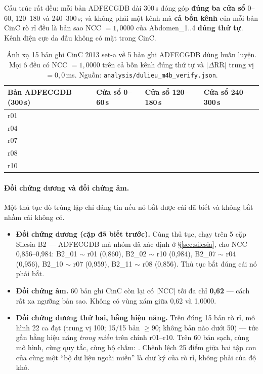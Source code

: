 Cấu trúc rất đều: mỗi bản ADFECGDB dài 300\,s đóng góp \textbf{đúng ba cửa sổ} 0--60, 120--180 và
240--300\,s; và không phải một kênh mà \textbf{cả bốn kênh} của mỗi bản CinC rò rỉ đều là bản sao
NCC $= 1{,}0000$ của Abdomen\_1..4 \textbf{đúng thứ tự}. Kênh điện cực da đầu không có mặt trong CinC.

\begin{table}[H]\centering\small
\caption{Ánh xạ 15 bản ghi CinC 2013 set-a về 5 bản ghi ADFECGDB dùng huấn luyện. Mọi ô đều có
NCC $= 1{,}0000$ trên cả bốn kênh đúng thứ tự và $|\Delta$RR$|$ trung vị $= 0{,}0$\,ms. Nguồn:
\texttt{analysis/dulieu\_m4b\_verify.json}.}
\label{tab:chonglan15}
\begin{tabular}{@{}L{3.4cm} C{3.0cm} C{3.0cm} C{3.0cm}@{}}
\toprule
\textbf{Bản ADFECGDB (300\,s)} & \textbf{Cửa sổ 0--60\,s} & \textbf{Cửa sổ 120--180\,s} &
\textbf{Cửa sổ 240--300\,s} \\
\midrule
r01 &  &  &  \\
r04 &  &  &  \\
r07 &  &  &  \\
r08 &  &  &  \\
r10 &  &  &  \\
\bottomrule
\end{tabular}
\end{table}

\paragraph{Đối chứng dương và đối chứng âm.}
Một thủ tục dò trùng lặp chỉ đáng tin nếu nó bắt được cái đã biết và không bắt nhầm cái không có.

\begin{itemize}[leftmargin=1.6em,itemsep=3pt]
\item \textbf{Đối chứng dương (cặp đã biết trước).} Cùng thủ tục, chạy trên 5 cặp Silesia B2 ---
ADFECGDB mà nhóm đã xác định ở \S\ref{sec:silesia}, cho NCC 0,856--0,984: B2\_01 $\sim$ r01 (0,860),
B2\_02 $\sim$ r10 (0,984), B2\_07 $\sim$ r04 (0,956), B2\_10 $\sim$ r07 (0,959), B2\_11 $\sim$ r08
(0,856). Thủ tục bắt đúng cái nó phải bắt.
\item \textbf{Đối chứng âm.} 60 bản ghi CinC còn lại có $|$NCC$|$ tối đa chỉ \textbf{0,62} --- cách rất
xa ngưỡng bản sao. Không có vùng xám giữa 0,62 và 1,0000.
\item \textbf{Đối chứng dương thứ hai, bằng hiệu năng.} Trên đúng 15 bản rò rỉ, mô hình 22 ca đạt
 (trung vị 100; 15/15 bản $\geq 90$; không bản nào dưới 50) --- tức gần bằng hiệu năng
\emph{trong miền} trên chính r01--r10. Trên 60 bản sạch, cùng mô hình, cùng quy tắc, cùng bộ chấm:
. Chênh lệch 25 điểm giữa hai tập con của cùng một ``bộ dữ liệu ngoài miền'' là chữ ký của
rò rỉ, không phải của độ khó.
\end{itemize}

